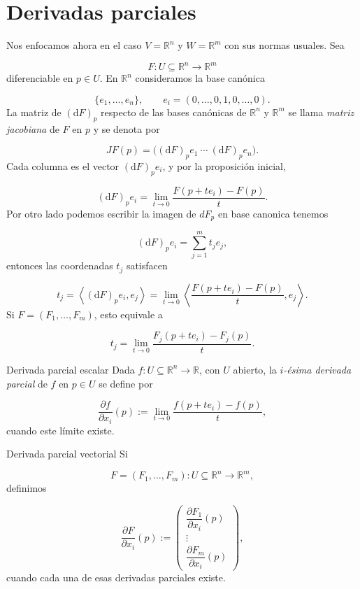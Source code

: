 \section{Derivadas parciales}
\begin{bookremark}{}
Nos enfocamos ahora en el caso $V=\mathbb{R}^n$ y $W=\mathbb{R}^m$ con sus normas usuales. Sea

\[
F \colon U \subseteq \mathbb{R}^n \to \mathbb{R}^m
\]
diferenciable en $p\in U$. En $\mathbb{R}^n$ consideramos la base canónica

\[
\{e_1,\dots,e_n\},\qquad e_i=(0,\dots,0,1,0,\dots,0).
\]
La matriz de $(\mathrm{d} F)_p$ respecto de las bases canónicas de $\mathbb{R}^n$ y $\mathbb{R}^m$ se llama \emph{matriz jacobiana} de $F$ en $p$ y se denota por

\[
JF(p)=\bigl((\mathrm{d} F)_p e_1 \ \cdots \ (\mathrm{d} F)_p e_n\bigr).
\]
Cada columna es el vector $(\mathrm{d} F)_p e_i$, y por la proposición inicial,

\[
(\mathrm{d} F)_p e_i=\lim_{t\to 0}\frac{F(p+t e_i)-F(p)}{t}.
\]
Por otro lado podemos escribir la imagen de $dF_{p}$ en base canonica tenemos

\[
(\mathrm{d} F)_p e_i = \sum_{j=1}^m t_j e_j,
\]
entonces las coordenadas $t_j$ satisfacen

\[
t_j=\left\langle (\mathrm{d} F)_p e_i,e_j\right\rangle=\lim_{t\to 0}\left\langle \frac{F(p+t e_i)-F(p)}{t},e_j\right\rangle.
\]
Si $F=(F_1,\dots,F_m)$, esto equivale a

\[
t_j=\lim_{t\to 0}\frac{F_j(p+t e_i)-F_j(p)}{t}.
\]
\end{bookremark}
\begin{bookdefinition}{Derivada parcial escalar}
Dada $f \colon U \subseteq \mathbb{R}^n \to \mathbb{R}$, con $U$ abierto, la \emph{$i$-ésima derivada parcial} de $f$ en $p\in U$ se define por

\[
\frac{\partial f}{\partial x_i}(p):= \lim_{t\to 0}\frac{f(p+t e_i)-f(p)}{t},
\]
cuando este límite existe.

\end{bookdefinition}
\begin{bookdefinition}{Derivada parcial vectorial}
Si

\[
F=(F_1,\dots,F_m)\colon U \subseteq \mathbb{R}^n \to \mathbb{R}^m,
\]
definimos

\[
\frac{\partial F}{\partial x_i}(p)
:=
\begin{pmatrix}
\dfrac{\partial F_1}{\partial x_i}(p)\\[0.6em]
\vdots\\[0.2em]
\dfrac{\partial F_m}{\partial x_i}(p)
\end{pmatrix},
\]
cuando cada una de esas derivadas parciales existe.

\end{bookdefinition}
